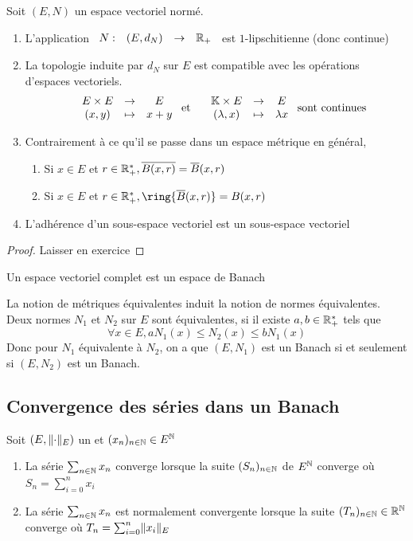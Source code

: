 \documentclass[]{report}
\begin{document}
    \begin{prop}{}{}
        Soit $(E,N)$ un espace vectoriel normé.
        \begin{enumerate}
            \item L'application $\begin{array}{ccccc} N : & (E,d_N) & \to & \mathbb{R}_+ \end{array}$ est $1$-lipschitienne (donc continue)
            \item La topologie induite par $d_N$ sur $E$ est compatible avec les opérations d'espaces vectoriels.
            \[\begin{array}{ccccc} & E\times E & \to & E \\ & (x,y) & \mapsto & x+y \end{array}\text{ et }\begin{array}{ccccc} & \mathbb{K}\times E & \to & E \\ & (\lambda,x) & \mapsto & \lambda x \end{array}\text{ sont continues}\]
            \item Contrairement à ce qu'il se passe dans un espace métrique en général,
            \begin{enumerate}
                \item Si $x\in E$ et $r\in \mathbb{R}_+^*, \overline{B(x,r)}=\overline{B}(x,r)$
                \item Si $x\in E$ et $r\in \R_+^*, \ring{\overline{B}(x,r)}=B(x,r)$
            \end{enumerate}
            \item L'adhérence d'un sous-espace vectoriel est un sous-espace vectoriel
        \end{enumerate}
    \end{prop}

    \begin{proof}
        Laisser en exercice
    \end{proof}

    \begin{df}{}{}
        Un espace vectoriel complet est un espace de Banach
    \end{df}

    \begin{re}{}{}
        La notion de métriques équivalentes induit la notion de normes équivalentes. Deux normes $N_1$ et $N_2$ sur $E$ sont équivalentes, si il existe $a,b\in \mathbb{R}_+^*$ tels que
        \[\forall x\in E, aN_1(x)\le N_2(x)\le bN_1(x)\]
        Donc pour $N_1$ équivalente à $N_2$, on a que $(E,N_1)$ est un Banach si et seulement si $(E,N_2)$ est un Banach.
    \end{re}

    \subsection*{Convergence des séries dans un Banach}

    \begin{df}{}{}
        Soit $(E,\lVert \cdot \rVert_E)$ un \evn et $(x_n)_{n\in\mathbb{N}} \in E^{\mathbb{N}}$
        \begin{enumerate}
            \item La série $\sum_{{n\in\mathbb{N}}} x_n$ converge lorsque la suite $(S_n)_{n\in\mathbb{N}}$ de $E^{\mathbb{N}}$ converge où $S_n=\sum_{i=0}^{n} x_i$
            \item La série $\sum_{{n\in\mathbb{N}}} x_n$ est normalement convergente lorsque la suite $(T_n)_{n\in\mathbb{N}}\in \mathbb{R}^{\mathbb{N}}$ converge où $T_n=\sum_{i=0}^{n}\lVert x_i \rVert_E$
        \end{enumerate}
    \end{df}
\end{document}
